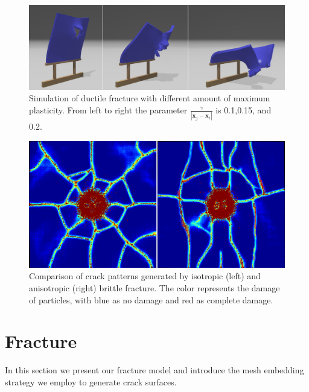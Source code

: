 \begin{figure}[t]
  \centering
  \includegraphics[width=\linewidth]{../figs/demo_impact_upside_plastic_fracture.png}
  \caption{\label{fig:5}
  Simulation of ductile fracture with different amount of maximum plasticity. From left to right the parameter $\frac{\gamma}{|\mathbf{x}_j-\mathbf{x}_i|}$ is 0.1,0.15, and 0.2.
}
\end{figure}
\begin{figure}[t]
  \centering
  \includegraphics[width=\linewidth, bb=0 0 1400 700]{../figs/demo_impact_color_map.png}
  \caption{\label{fig:6}
  Comparison of crack patterns generated by isotropic (left) and anisotropic (right) brittle fracture. The color represents the damage of particles, with blue as no damage and red as complete damage.
}
\end{figure}
\section{Fracture}

In this section we present our fracture model and introduce the mesh embedding strategy we employ to generate crack surfaces.

